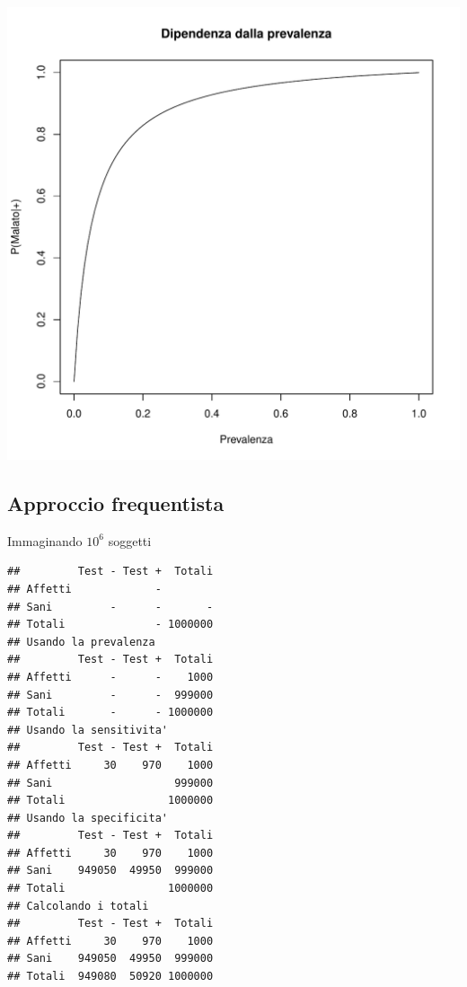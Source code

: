 \documentclass[onecolumn,12pt]{book}\usepackage[]{graphicx}\usepackage[]{color}
\makeatletter
\def\maxwidth{ %
  \ifdim\Gin@nat@width>\linewidth
    \linewidth
  \else
    \Gin@nat@width
  \fi
}
\newenvironment{kframe}{%
 \def\at@end@of@kframe{}%
 \ifinner\ifhmode%
  \def\at@end@of@kframe{\end{minipage}}%
  \begin{minipage}{\columnwidth}%
 \fi\fi%
 \def\FrameCommand##1{\hskip\@totalleftmargin \hskip-\fboxsep
 \colorbox{shadecolor}{##1}\hskip-\fboxsep
     \hskip-\linewidth \hskip-\@totalleftmargin \hskip\columnwidth}%
 \MakeFramed {\advance\hsize-\width
   \@totalleftmargin\z@ \linewidth\hsize
   \@setminipage}}%
 {\par\unskip\endMakeFramed%
 \at@end@of@kframe}
\newenvironment{knitrout}{}{} %
\makeatother
\begin{document}
\begin{knitrout}
\color{fgcolor}
\includegraphics[width=\maxwidth]{figure/unnamed-chunk-25-1} 

\end{knitrout}



\subsection{Approccio frequentista}
Immaginando $10^6$ soggetti

\begin{knitrout}
\color{fgcolor}\begin{kframe}
\begin{verbatim}
##         Test - Test +  Totali
## Affetti             -        
## Sani         -      -       -
## Totali              - 1000000
## Usando la prevalenza
##         Test - Test +  Totali
## Affetti      -      -    1000
## Sani         -      -  999000
## Totali       -      - 1000000
## Usando la sensitivita'
##         Test - Test +  Totali
## Affetti     30    970    1000
## Sani                   999000
## Totali                1000000
## Usando la specificita'
##         Test - Test +  Totali
## Affetti     30    970    1000
## Sani    949050  49950  999000
## Totali                1000000
## Calcolando i totali
##         Test - Test +  Totali
## Affetti     30    970    1000
## Sani    949050  49950  999000
## Totali  949080  50920 1000000
\end{verbatim}
\end{kframe}
\end{knitrout}
\end{document}
